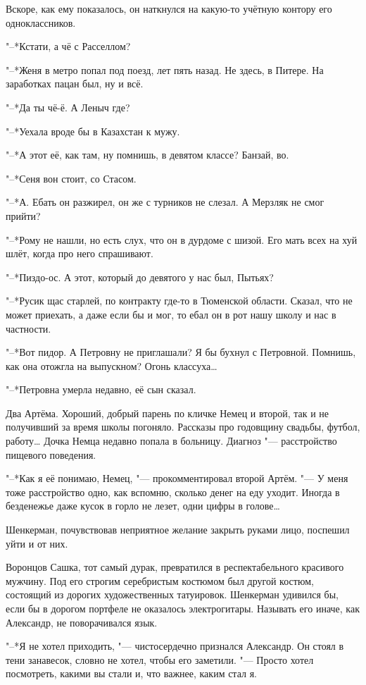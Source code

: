 Вскоре, как ему показалось, он наткнулся на какую-то учётную контору его одноклассников.

"--*Кстати, а чё с Расселлом?

"--*Женя в метро попал под поезд, лет пять назад.
Не здесь, в Питере.
На заработках пацан был, ну и всё.

"--*Да ты чё-ё.
А Леныч где?

"--*Уехала вроде бы в Казахстан к мужу.

"--*А этот её, как там, ну помнишь, в девятом классе?
Банзай, во.

"--*Сеня вон стоит, со Стасом.

"--*А.
Ебать он разжирел, он же с турников не слезал.
А Мерзляк не смог прийти?

"--*Рому не нашли, но есть слух, что он в дурдоме с шизой.
Его мать всех на хуй шлёт, когда про него спрашивают.

"--*Пиздо-ос.
А этот, который до девятого у нас был, Пытьях?

"--*Русик щас старлей, по контракту где-то в Тюменской области.
Сказал, что не может приехать, а даже если бы и мог, то ебал он в рот нашу школу и нас в частности.

"--*Вот пидор.
А Петровну не приглашали?
Я бы бухнул с Петровной.
Помнишь, как она отожгла на выпускном?
Огонь классуха\ldots{}

"--*Петровна умерла недавно, её сын сказал.

Два Артёма.
Хороший, добрый парень по кличке Немец и второй, так и не получивший за время школы погоняло.
Рассказы про годовщину свадьбы, футбол, работу\ldots{}
Дочка Немца недавно попала в больницу.
Диагноз "--- расстройство пищевого поведения.

"--*Как я её понимаю, Немец, "--- прокомментировал второй Артём.
"--- У меня тоже расстройство одно, как вспомню, сколько денег на еду уходит.
Иногда в безденежье даже кусок в горло не лезет, одни цифры в голове\ldots{}

Шенкерман, почувствовав неприятное желание закрыть руками лицо, поспешил уйти и от них.

Воронцов Сашка, тот самый дурак, превратился в респектабельного красивого мужчину.
Под его строгим серебристым костюмом был другой костюм, состоящий из дорогих художественных татуировок.
Шенкерман удивился бы, если бы в дорогом портфеле не оказалось электрогитары.
Называть его иначе, как Александр, не поворачивался язык.

"--*Я не хотел приходить, "--- чистосердечно признался Александр.
Он стоял в тени занавесок, словно не хотел, чтобы его заметили.
"--- Просто хотел посмотреть, какими вы стали и, что важнее, каким стал я.

